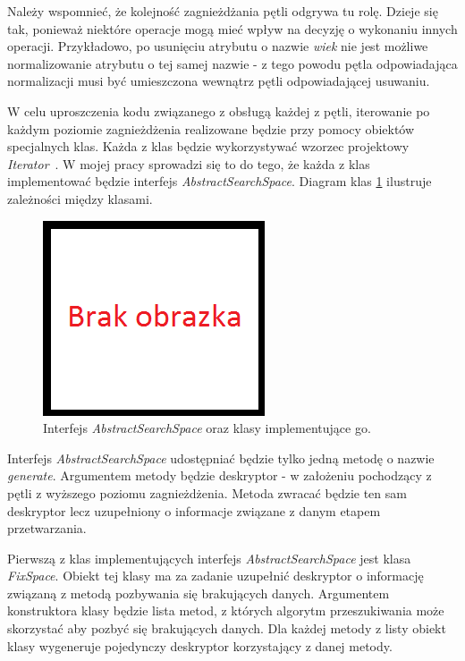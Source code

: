 \documentclass[../thesis.tex]{subfiles}
\begin{document}
Należy wspomnieć, że kolejność zagnieżdżania pętli odgrywa tu rolę. Dzieje się tak, ponieważ niektóre operacje mogą mieć wpływ na decyzję o wykonaniu innych operacji. Przykładowo, po usunięciu atrybutu o nazwie \emph{wiek} nie jest możliwe normalizowanie atrybutu o tej samej nazwie - z tego powodu pętla odpowiadająca normalizacji musi być umieszczona wewnątrz pętli odpowiadającej usuwaniu. 

W celu uproszczenia kodu związanego z obsługą każdej z pętli, iterowanie po każdym poziomie zagnieżdżenia realizowane będzie przy pomocy obiektów specjalnych klas. Każda z klas będzie wykorzystywać wzorzec projektowy \emph{Iterator}~\cite{gang_of_four}. W mojej pracy sprowadzi się to do tego, że każda z klas implementować będzie interfejs \emph{AbstractSearchSpace}. Diagram klas \ref{proj:diagram_abstractsearchspace} ilustruje zależności między klasami.

\begin{figure}
\centering
\includegraphics{missing.png}
\caption{Interfejs \emph{AbstractSearchSpace} oraz klasy implementujące go.}
\label{proj:diagram_abstractsearchspace}
\end{figure}

Interfejs \emph{AbstractSearchSpace} udostępniać będzie tylko jedną metodę o nazwie \emph{generate}. Argumentem metody będzie deskryptor - w założeniu pochodzący z pętli z wyższego poziomu zagnieżdżenia. Metoda zwracać będzie ten sam deskryptor lecz uzupełniony o informacje związane z danym etapem przetwarzania.

Pierwszą z klas implementujących interfejs \emph{AbstractSearchSpace} jest klasa \emph{FixSpace}. Obiekt tej klasy ma za zadanie uzupełnić deskryptor o informację związaną z metodą pozbywania się brakujących danych. Argumentem konstruktora klasy będzie lista metod, z których algorytm przeszukiwania może skorzystać aby pozbyć się brakujących danych. Dla każdej metody z listy obiekt klasy wygeneruje pojedynczy deskryptor korzystający z danej metody.
\end{document}
